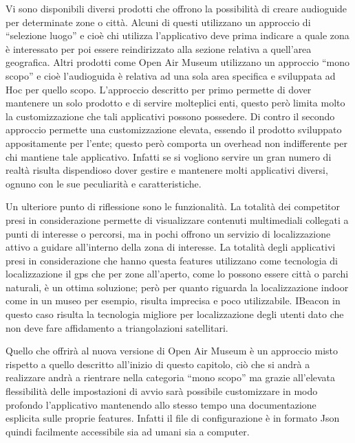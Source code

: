 Vi sono disponibili diversi prodotti che offrono la possibilità di creare audioguide per determinate zone o città. Alcuni di questi utilizzano un approccio di “selezione luogo” e cioè chi utilizza l’applicativo deve prima indicare a quale zona è interessato per poi essere reindirizzato alla sezione relativa a quell’area geografica. Altri prodotti come Open Air Museum utilizzano un approccio “mono scopo” e cioè l’audioguida è relativa ad una sola area specifica e sviluppata ad Hoc per quello scopo. L’approccio descritto per primo permette di dover mantenere un solo prodotto e di servire molteplici enti, questo però limita molto la customizzazione che tali applicativi possono possedere. Di contro il secondo approccio permette una customizzazione elevata, essendo il prodotto sviluppato appositamente per l’ente; questo però comporta un overhead non indifferente per chi mantiene tale applicativo. Infatti se si vogliono servire un gran numero di realtà risulta dispendioso dover gestire e mantenere molti applicativi diversi, ognuno con le sue peculiarità e caratteristiche.\vspace{5mm}

Un ulteriore punto di riflessione sono le funzionalità. La totalità dei competitor presi in considerazione permette di visualizzare contenuti multimediali collegati a punti di interesse o percorsi, ma in pochi offrono un servizio di localizzazione attivo a guidare all’interno della zona di interesse. La totalità degli applicativi presi in considerazione che hanno questa features utilizzano come tecnologia di localizzazione il gps che per zone all’aperto, come lo possono essere città o parchi naturali, è un ottima soluzione; però per quanto riguarda la localizzazione indoor come in un museo per esempio, risulta imprecisa e poco utilizzabile. IBeacon in questo caso risulta la tecnologia migliore per localizzazione degli utenti dato che non deve fare affidamento a triangolazioni satellitari.\vspace{5mm}

Quello che offrirà al nuova versione di Open Air Museum è un approccio misto rispetto a quello descritto all’inizio di questo capitolo, ciò che si andrà a realizzare andrà a rientrare nella categoria “mono scopo” ma grazie all’elevata flessibilità delle impostazioni di avvio sarà possibile customizzare in modo profondo l’applicativo mantenendo allo stesso tempo una documentazione esplicita sulle proprie features. Infatti il file di configurazione è in formato Json\cite{JSON} quindi facilmente accessibile sia ad umani sia a computer.\vspace{5mm}

